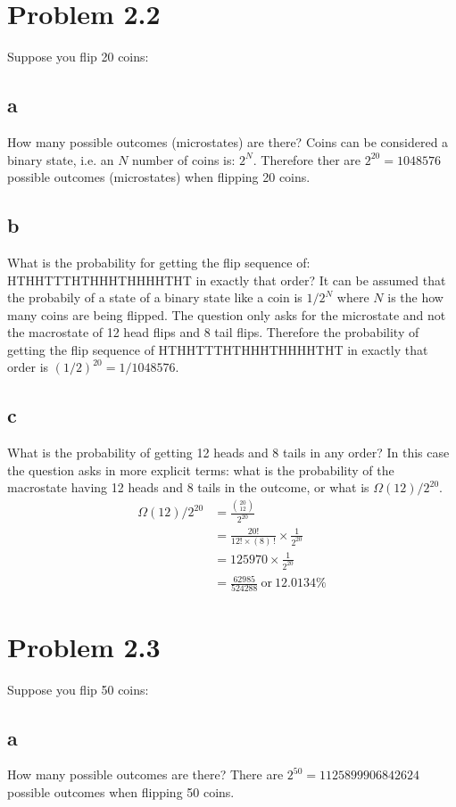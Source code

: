 \documentclass[a4paper,floatfix,nofootinbib]{article}
\begin{document}
\section*{Problem 2.2}
Suppose you flip 20 coins:

\subsection*{a}
How many possible outcomes (microstates) are there? Coins can be considered a binary state, i.e. an $N$ number of coins is: $2^N$. Therefore ther are $2^{20} = 1048576$ possible outcomes (microstates) when flipping 20 coins.

\subsection*{b}
What is the probability for getting the flip sequence of: HTHHTTTHTHHHTHHHHTHT in exactly that order? It can be assumed that the probabily of a state of a binary state like a coin is $1/2^N$ where $N$ is the how many coins are being flipped. The question only asks for the microstate and not the macrostate of 12 head flips and 8 tail flips. Therefore the probability of getting the flip sequence of HTHHTTTHTHHHTHHHHTHT in exactly that order is $(1/2)^20 = 1/1048576$.

\subsection*{c}
What is the probability of getting 12 heads and 8 tails in any order? In this case the question asks in more explicit terms: what is the probability of the macrostate having 12 heads and 8 tails in the outcome, or what is $\Omega(12)/2^{20}$. 
\begin{align*}
    \Omega(12)/2^{20} &= \frac{\binom{20}{12}}{2^{20}} \\
        &= \frac{ 20! }{ 12! \times \left( 8 \right) \,! } \times \frac{ 1 }{ 2^{20} } \\
        &= 125970 \times \frac{ 1 }{ 2^{20} }   \\
        &= \frac{ 62985 }{ 524288 } \ \textrm{or} \ 12.0134\%
\end{align*}

\section*{Problem 2.3}
Suppose you flip 50 coins:

\subsection*{a}
How many possible outcomes are there?
There are $2^{50} = 1125899906842624$ possible outcomes when flipping 50 coins.
\end{document}
